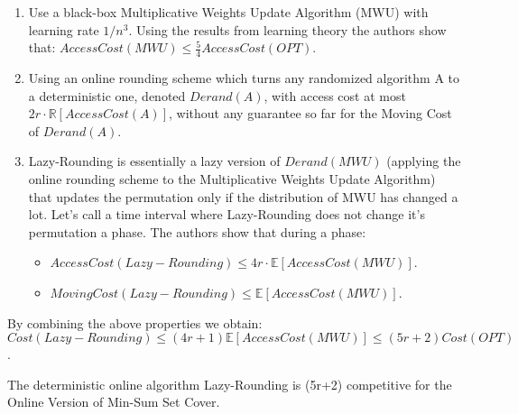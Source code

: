\begin{enumerate}
    \item Use a black-box Multiplicative Weights Update Algorithm (MWU) with learning rate $1/n^3$. Using the results from learning theory the authors show that: $AccessCost(MWU) \leq \frac{5}{4} AccessCost(OPT)$.
    
    \item Using an online rounding scheme which turns any randomized algorithm A to a deterministic one, denoted $Derand(A)$, with access cost at most $2r \cdot \mathbb{R}[AccessCost(A)]$, without any guarantee so far for the Moving Cost of $Derand(A)$.
    
    \item Lazy-Rounding is essentially a lazy version of $Derand(MWU)$ (applying the online rounding scheme to the Multiplicative Weights Update Algorithm) that updates the permutation only if the distribution of MWU has changed a lot. Let's call a time interval where Lazy-Rounding does not change it's permutation a phase. The authors show that during a phase:
        \begin{itemize}
            \item $AccessCost(Lazy-Rounding) \leq 4r \cdot \mathbb{E}[AccessCost(MWU)]$.
            \item $MovingCost(Lazy-Rounding) \leq \mathbb{E}[AccessCost(MWU)]$.
        \end{itemize}
\end{enumerate}

By combining the above properties we obtain: $$Cost(Lazy-Rounding) \leq (4r+1) \mathbb{E}[AccessCost(MWU)] \leq (5r+2) Cost(OPT)$$.

\begin{theorem}
    The deterministic online algorithm Lazy-Rounding is (5r+2) competitive for the Online Version of Min-Sum Set Cover.
\end{theorem}